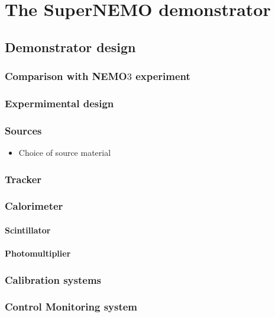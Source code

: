 \chapter{The SuperNEMO demonstrator}
\label{ch:detector}

\section{Demonstrator design}
\subsection{Comparison with NEMO$3$ experiment}
\subsection{Expermimental design}
\subsection{Sources}
\begin{itemize}
\item Choice of source material
\end{itemize}

\subsection{Tracker}
\subsection{Calorimeter}
\label{subsec:SN_calo}



\subsubsection{Scintillator}





\subsubsection{Photomultiplier}
\label{sec:calorimeter}
\subsection{Calibration systems}
\subsection{Control Monitoring system}
